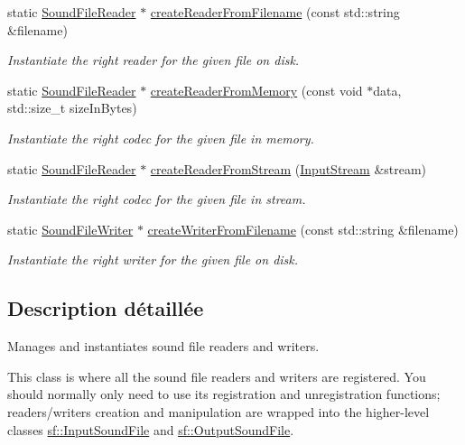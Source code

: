 \begin{DoxyCompactItemize}
static \hyperlink{classsf_1_1SoundFileReader}{Sound\+File\+Reader} $\ast$ \hyperlink{classsf_1_1SoundFileFactory_af0a87110e0b8a77aada17b22a016c066}{create\+Reader\+From\+Filename} (const std\+::string \&filename)
\begin{DoxyCompactList}\small\item\em Instantiate the right reader for the given file on disk. \end{DoxyCompactList}\item 
static \hyperlink{classsf_1_1SoundFileReader}{Sound\+File\+Reader} $\ast$ \hyperlink{classsf_1_1SoundFileFactory_aee7a0ff1eace98d5325eaadc7d26d50c}{create\+Reader\+From\+Memory} (const void $\ast$data, std\+::size\+\_\+t size\+In\+Bytes)
\begin{DoxyCompactList}\small\item\em Instantiate the right codec for the given file in memory. \end{DoxyCompactList}\item 
static \hyperlink{classsf_1_1SoundFileReader}{Sound\+File\+Reader} $\ast$ \hyperlink{classsf_1_1SoundFileFactory_a8d4b1f225b72a128ddba3be22f7ba5a2}{create\+Reader\+From\+Stream} (\hyperlink{classsf_1_1InputStream}{Input\+Stream} \&stream)
\begin{DoxyCompactList}\small\item\em Instantiate the right codec for the given file in stream. \end{DoxyCompactList}\item 
static \hyperlink{classsf_1_1SoundFileWriter}{Sound\+File\+Writer} $\ast$ \hyperlink{classsf_1_1SoundFileFactory_a0702eb2e8a4a171ba80c7fbd04c4defc}{create\+Writer\+From\+Filename} (const std\+::string \&filename)
\begin{DoxyCompactList}\small\item\em Instantiate the right writer for the given file on disk. \end{DoxyCompactList}\end{DoxyCompactItemize}


\subsection{Description détaillée}
Manages and instantiates sound file readers and writers. 

This class is where all the sound file readers and writers are registered. You should normally only need to use its registration and unregistration functions; readers/writers creation and manipulation are wrapped into the higher-\/level classes \hyperlink{classsf_1_1InputSoundFile}{sf\+::\+Input\+Sound\+File} and \hyperlink{classsf_1_1OutputSoundFile}{sf\+::\+Output\+Sound\+File}.

